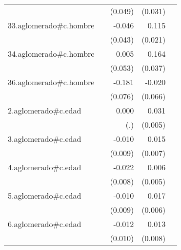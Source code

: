 {\begin{longtable}{l*{4}{D{.}{.}{-1}}}
            &                     &     (0.049)         &     (0.031)         &                     \\
\addlinespace
33.aglomerado#c.hombre&                     &      -0.046         &       0.115\sym{***}&                     \\
            &                     &     (0.043)         &     (0.021)         &                     \\
\addlinespace
34.aglomerado#c.hombre&                     &       0.005         &       0.164\sym{***}&                     \\
            &                     &     (0.053)         &     (0.037)         &                     \\
\addlinespace
36.aglomerado#c.hombre&                     &      -0.181\sym{*}  &      -0.020         &                     \\
            &                     &     (0.076)         &     (0.066)         &                     \\
\addlinespace
2.aglomerado#c.edad&                     &       0.000         &       0.031\sym{***}&                     \\
            &                     &         (.)         &     (0.005)         &                     \\
\addlinespace
3.aglomerado#c.edad&                     &      -0.010         &       0.015\sym{*}  &                     \\
            &                     &     (0.009)         &     (0.007)         &                     \\
\addlinespace
4.aglomerado#c.edad&                     &      -0.022\sym{**} &       0.006         &                     \\
            &                     &     (0.008)         &     (0.005)         &                     \\
\addlinespace
5.aglomerado#c.edad&                     &      -0.010         &       0.017\sym{**} &                     \\
            &                     &     (0.009)         &     (0.006)         &                     \\
\addlinespace
6.aglomerado#c.edad&                     &      -0.012         &       0.013         &                     \\
            &                     &     (0.010)         &     (0.008)         &                     \\

\end{longtable}}

